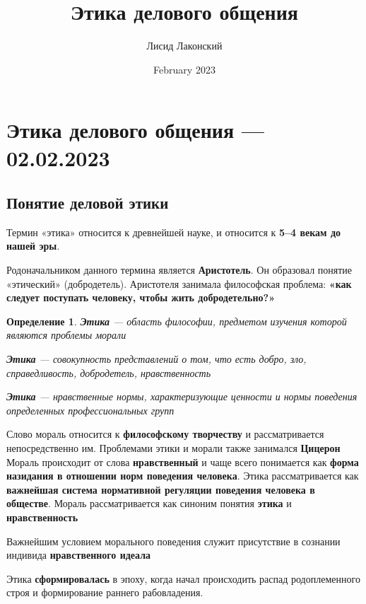 \documentclass{article}
\title{Этика делового общения}
\author{Лисид Лаконский}
\date{February 2023}
\newtheorem{definition}{Определение}
\begin{document}
\raggedright

\maketitle
\tableofcontents
\pagebreak

\section{Этика делового общения — 02.02.2023}

\subsection{Понятие деловой этики}

Термин «этика» относится к древнейшей науке, и относится к \textbf{5–4 векам до нашей эры}.

Родоначальником данного термина является \textbf{Аристотель}. Он образовал понятие «этический» (добродетель). Аристотеля занимала философская проблема: \textbf{«как следует поступать человеку, чтобы жить добродетельно?»}

\begin{definition}
\textbf{Этика} — область философии, предметом изучения которой являются проблемы морали

\textbf{Этика} — совокупность представлений о том, что есть добро, зло, справедливость, добродетель, нравственность

\textbf{Этика} — нравственные нормы, характеризующие ценности и нормы поведения определенных профессиональных групп
\end{definition}

Слово мораль относится к \textbf{философскому творчеству} и рассматривается непосредственно им. Проблемами этики и морали также занимался \textbf{Цицерон} Мораль происходит от слова \textbf{нравственный} и чаще всего понимается как \textbf{форма назидания в отношении норм поведения человека}. Этика рассматривается как \textbf{важнейшая система нормативной регуляции поведения человека в обществе}. Мораль рассматривается как синоним понятия \textbf{этика} и \textbf{нравственность}

\hfill

Важнейшим условием морального поведения служит присутствие в сознании индивида \textbf{нравственного идеала}

Этика \textbf{сформировалась} в эпоху, когда начал происходить распад родоплеменного строя и формирование раннего рабовладения.
\end{document}
